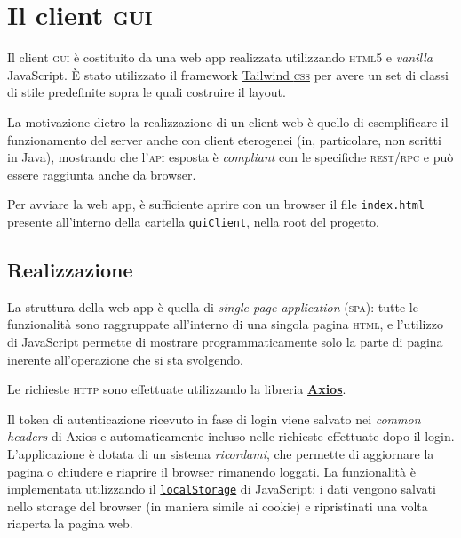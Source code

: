 \documentclass[a4paper,8pt]{article} %
\def\code#1{\texttt{#1}}
\begin{document}
\section{Il client \textsc{gui}}
Il client \textsc{gui} è costituito da una web app realizzata utilizzando \textsc{html5} e \emph{vanilla} JavaScript.
È stato utilizzato il framework \href{https://tailwindcss.com/}{Tailwind \textsc{css}} per avere un set di classi di stile predefinite sopra le quali costruire il layout.
\par La motivazione dietro la realizzazione di un client web è quello di esemplificare il funzionamento del server anche con client eterogenei (in, particolare, non scritti in Java), mostrando
che l'\textsc{api} esposta è \emph{compliant} con le specifiche \textsc{rest}/\textsc{rpc} e può essere raggiunta anche da browser.
\par Per avviare la web app, è sufficiente aprire con un browser il file \code{index.html} presente all'interno della cartella \code{guiClient}, nella root del progetto.

\subsection{Realizzazione}
La struttura della web app è quella di \emph{single-page application} (\textsc{spa}): tutte le funzionalità sono raggruppate all'interno di una singola pagina \textsc{html}, e l'utilizzo di JavaScript permette di mostrare programmaticamente
solo la parte di pagina inerente all'operazione che si sta svolgendo.
\par Le richieste \textsc{http} sono effettuate utilizzando la libreria \href{https://axios-http.com/docs/intro}{\textbf{Axios}}.
\par Il token di autenticazione ricevuto in fase di login viene salvato nei \emph{common headers} di Axios e automaticamente incluso nelle richieste effettuate dopo il login.
L'applicazione è dotata di un sistema \emph{ricordami}, che permette di aggiornare la pagina o chiudere e riaprire il browser rimanendo loggati. La funzionalità è implementata utilizzando
il \href{https://developer.mozilla.org/en-US/docs/Web/API/Window/localStorage?retiredLocale=it}{\code{localStorage}} di JavaScript: i dati vengono salvati nello storage del browser (in maniera simile ai cookie) e ripristinati
una volta riaperta la pagina web.
\end{document}
